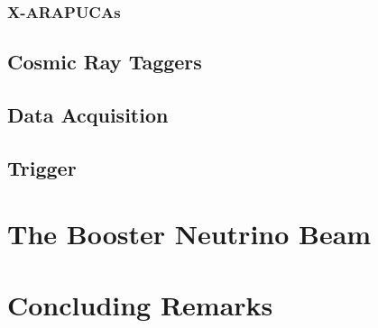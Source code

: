 
\subsubsection{X-ARAPUCAs}

\subsection{Cosmic Ray Taggers}

\subsection{Data Acquisition}

\subsection{Trigger}

\section{The Booster Neutrino Beam}

\section{Concluding Remarks}
